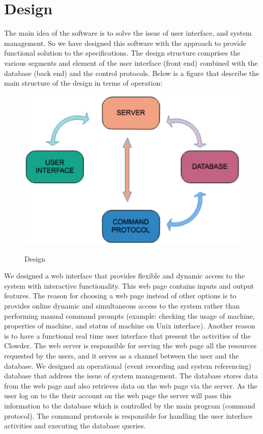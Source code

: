 \section{Design}
The main idea of the software is to solve the issue of user interface, and system management. So we have designed this software with the approach to provide functional solution to the specifications. The design structure comprises the various  segments and element of the user interface (front end) combined with the database (back end)  and the control protocols. Below is a figure that describe the main structure of the design in terms of operation:

\begin{figure}[h]
  \includegraphics[width=\linewidth]{Design-png-2.eps}
  \label{fig:Design of program}
  \caption{Design}
\end{figure}

We designed a web interface that provides  flexible and dynamic access to the system with interactive functionality. This web page contains inputs and output features. The reason for choosing a web page instead of other options is to provides online dynamic and simultaneous  access to the system rather than performing manual command prompts (example: checking the usage of machine, properties of machine, and status of machine on Unix interface). Another reason is to have a functional real time user interface that present the activities of the Clowder. The web server is responsible for serving the web page all the resources requested by the users, and it serves as a channel between the user and the database. We designed an operational (event recording and system referencing) database that address the issue of system management. The database stores data from the web page and also retrieves data on the web page via the server. As the user log on to the their account on the web page the server will pass this information to the  database which is controlled by the main program (command protocol). The command protocols is responsible for handling the user interface activities and executing the database queries.  

